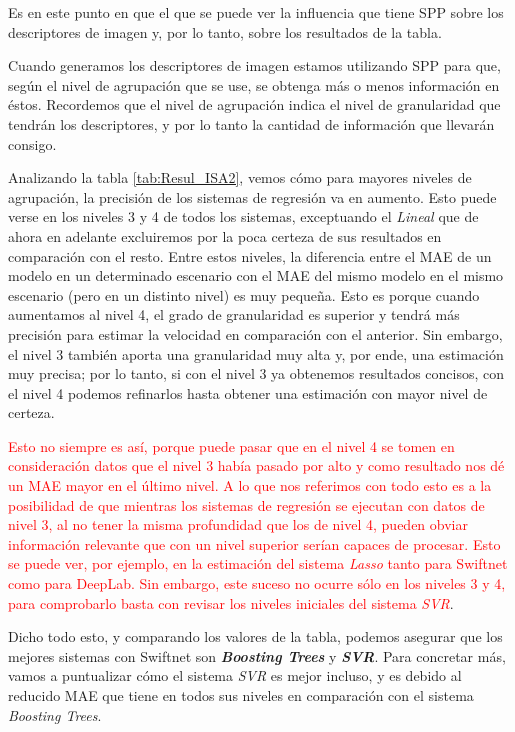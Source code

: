 Es en este punto en que el que se puede ver la influencia que tiene \ac{SPP} sobre los descriptores de imagen y, por lo tanto, sobre los resultados de la tabla.

Cuando generamos los descriptores de imagen estamos utilizando \ac{SPP} para que, según el nivel de agrupación que se use, se obtenga más o menos información en éstos. Recordemos que el nivel de agrupación indica el nivel de granularidad que tendrán los descriptores, y por lo tanto la cantidad de información que llevarán consigo.

Analizando la tabla \ref{tab:Resul_ISA2}, vemos cómo para mayores niveles de agrupación, la precisión de los sistemas de regresión va en aumento. Esto puede verse en los niveles 3 y 4 de todos los sistemas, exceptuando el \textit{Lineal} que de ahora en adelante excluiremos por la poca certeza de sus resultados en comparación con el resto. Entre estos niveles, la diferencia entre el \ac{MAE} de un modelo en un determinado escenario con el \ac{MAE} del mismo modelo en el mismo escenario (pero en un distinto nivel) es muy pequeña. Esto es porque cuando aumentamos al nivel 4, el grado de granularidad es superior y tendrá más precisión para estimar la velocidad en comparación con el anterior. Sin embargo, el nivel 3 también aporta una granularidad muy alta y, por ende, una estimación muy precisa; por lo tanto, si con el nivel 3 ya obtenemos resultados concisos, con el nivel 4 podemos refinarlos hasta obtener una estimación con mayor nivel de certeza.

\textcolor{red}{Esto no siempre es así, porque puede pasar que en el nivel 4 se tomen en consideración datos que el nivel 3 había pasado por alto y como resultado nos dé un \ac{MAE} mayor en el último nivel. A lo que nos referimos con todo esto es a la posibilidad de que mientras los sistemas de regresión se ejecutan con datos de nivel 3, al no tener la misma profundidad que los de nivel 4, pueden obviar información relevante que con un nivel superior serían capaces de procesar. Esto se puede ver, por ejemplo, en la estimación del sistema \textit{Lasso} tanto para Swiftnet como para DeepLab. Sin embargo, este suceso no ocurre sólo en los niveles 3 y 4, para comprobarlo basta con revisar los niveles iniciales del sistema \textit{\ac{SVR}}}.

Dicho todo esto, y comparando los valores de la tabla, podemos asegurar que los mejores sistemas con Swiftnet son \textbf{\textit{Boosting Trees}} y \textbf{\textit{\ac{SVR}}}. Para concretar más, vamos a puntualizar cómo el sistema \textit{\ac{SVR}} es mejor incluso, y es debido al reducido \ac{MAE} que tiene en todos sus niveles en comparación con el sistema \textit{Boosting Trees}.

